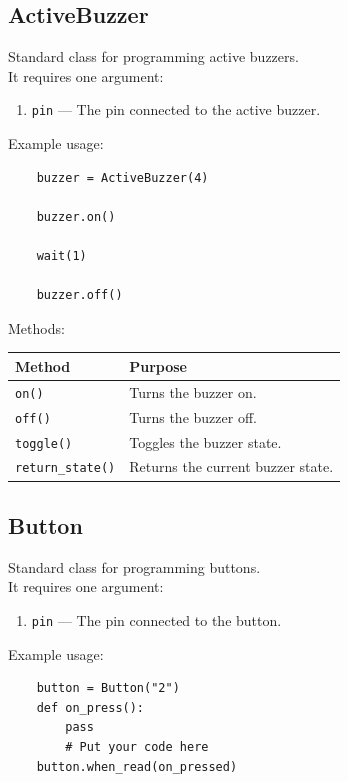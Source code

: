 \newpage

\subsection{ActiveBuzzer}

Standard class for programming active buzzers.\\
It requires one argument:

\begin{enumerate}
	\item \texttt{pin} --- The pin connected to the active buzzer.
\end{enumerate}

Example usage:

\begin{lstlisting}
	buzzer = ActiveBuzzer(4)
	
	buzzer.on()
	
	wait(1)
	
	buzzer.off()
\end{lstlisting}

Methods:

\begin{tabular}{ll}
	\toprule
	\textbf{Method} & \textbf{Purpose}\\
	\midrule
	\texttt{on()} & Turns the buzzer on.\\
	\texttt{off()} & Turns the buzzer off.\\
	\texttt{toggle()} & Toggles the buzzer state.\\
	\texttt{return\_state()} & Returns the current buzzer state.\\
	\bottomrule
\end{tabular}





\subsection{Button}

Standard class for programming buttons.\\
It requires one argument:

\begin{enumerate}
	\item \texttt{pin} --- The pin connected to the button.
\end{enumerate}

Example usage:

\begin{lstlisting}
	button = Button("2")
	def on_press():
        pass
        # Put your code here
	button.when_read(on_pressed)
\end{lstlisting}

